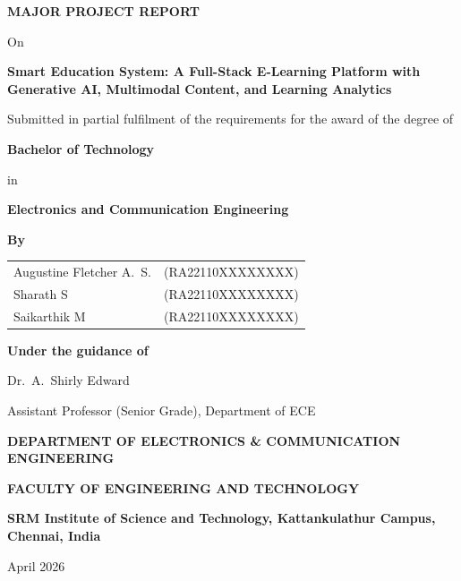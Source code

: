 \documentclass[a4paper,12pt,openany]{report}
\newcommand{\ProjectTitle}{Smart Education System: A Full-Stack E-Learning Platform with Generative AI, Multimodal Content, and Learning Analytics}
\newcommand{\DegreeName}{Bachelor of Technology}
\newcommand{\BranchName}{Electronics and Communication Engineering}
\newcommand{\CampusLine}{SRM Institute of Science and Technology, Kattankulathur Campus, Chennai, India}
\newcommand{\ReportMonthYear}{April 2026}
\newcommand{\StudentOneName}{Augustine Fletcher A.\ S.}
\newcommand{\StudentOneReg}{RA22110XXXXXXXX}
\newcommand{\StudentTwoName}{Sharath S}
\newcommand{\StudentTwoReg}{RA22110XXXXXXXX}
\newcommand{\StudentThreeName}{Saikarthik M}
\newcommand{\StudentThreeReg}{RA22110XXXXXXXX}
\newcommand{\GuideName}{Dr.\ A.\ Shirly Edward}
\newcommand{\GuideDesignation}{Assistant Professor (Senior Grade), Department of ECE}
\begin{document}
\begin{titlepage}
\centering
\vspace*{1cm}
{\Large\bfseries MAJOR PROJECT REPORT\par}
\vspace{1.2cm}
{\large On\par}
\vspace{0.6cm}
{\Large\bfseries \ProjectTitle\par}
\vspace{1.5cm}
{\large Submitted in partial fulfilment of the requirements for the award of the degree of\par}
\vspace{0.5cm}
{\Large\bfseries \DegreeName\par}
\vspace{0.4cm}
{\large in\par}
\vspace{0.4cm}
{\Large\bfseries \BranchName\par}
\vspace{1.2cm}
{\large\textbf{By}\par}
\vspace{0.6cm}
\begin{tabular}{ll}
\StudentOneName & (\StudentOneReg) \\[0.35em]
\StudentTwoName & (\StudentTwoReg) \\[0.35em]
\StudentThreeName & (\StudentThreeReg) \\
\end{tabular}
\vspace{1cm}
{\large\textbf{Under the guidance of}\par}
\vspace{0.5cm}
{\large \GuideName\par}
{\normalsize \GuideDesignation\par}
\vfill
{\large\textbf{DEPARTMENT OF ELECTRONICS \& COMMUNICATION ENGINEERING}\par}
\vspace{0.35cm}
{\large\textbf{FACULTY OF ENGINEERING AND TECHNOLOGY}\par}
\vspace{0.35cm}
{\large\textbf{\CampusLine}\par}
\vspace{0.8cm}
{\large \ReportMonthYear\par}
\end{titlepage}

\setcounter{page}{1}
\end{document}
